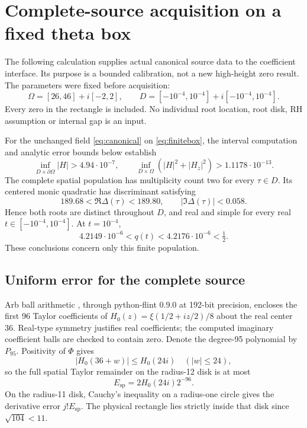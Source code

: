 \section{Complete-source acquisition on a fixed theta box}
\label{sec:finite}
The following calculation supplies actual canonical source data to the
coefficient interface. Its purpose is a bounded calibration, not a new
high-height zero result. The parameters were fixed before acquisition:
\begin{equation}
 \Omega=[26,46]+i[-2,2],\qquad
 D=[-10^{-4},10^{-4}]+i[-10^{-4},10^{-4}].
 \label{eq:finitebox}
\end{equation}
Every zero in the rectangle is included. No individual root location,
root disk, RH assumption or internal gap is an input.

\begin{theorem}
\label{thm:finitecertificate}
For the unchanged field \eqref{eq:canonical} on \eqref{eq:finitebox},
the interval computation and analytic error bounds below establish
\[
 \inf_{D\times\partial\Omega}|H|>4.94\cdot10^{-7},\qquad
 \inf_{D\times\Omega}(|H|^2+|H_z|^2)>1.1178\cdot10^{-13}.
\]
The complete spatial population has multiplicity count two for every
\(\tau\in D\). Its centered monic quadratic has discriminant satisfying
\[
 189.68<\Re\Delta(\tau)<189.80,\qquad
 |\Im\Delta(\tau)|<0.058.
\]
Hence both roots are distinct throughout \(D\), and real and simple for
every real \(t\in[-10^{-4},10^{-4}]\). At \(t=10^{-4}\),
\[
 4.2149\cdot10^{-6}<q(t)<4.2176\cdot10^{-6}<\tfrac12.
\]
These conclusions concern only this finite population.
\end{theorem}

\subsection{Uniform error for the complete source}
Arb ball arithmetic \cite{arb}, through python-flint 0.9.0 at 192-bit
precision, encloses the first 96 Taylor coefficients of
\(H_0(z)=\xi(1/2+iz/2)/8\) about the real center 36. Real-type symmetry
justifies real coefficients; the computed imaginary coefficient balls
are checked to contain zero. Denote the degree-95 polynomial by
\(P_{95}\). Positivity of \(\Phi\) gives
\[
 |H_0(36+w)|\le H_0(24i)\quad(|w|\le24),
\]
so the full spatial Taylor remainder on the radius-12 disk is at most
\begin{equation}
 E_{\mathrm{sp}}=2H_0(24i)2^{-96}.
 \label{eq:spatialtail}
\end{equation}
On the radius-11 disk, Cauchy's inequality on a radius-one circle gives
the derivative error \(j!E_{\mathrm{sp}}\). The physical rectangle lies
strictly inside that disk since \(\sqrt{104}<11\).

